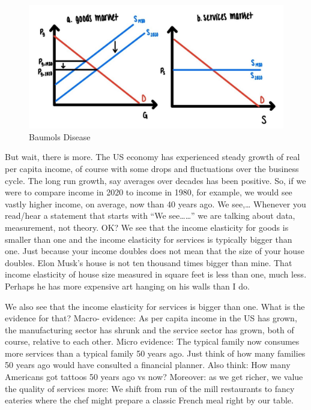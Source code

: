 \documentclass[
]{book}
\begin{document}
\begin{figure}

{\centering \includegraphics[width=1\linewidth]{img/ch5/fig12} 

}

\caption{Baumols Disease}\label{fig:fig512}
\end{figure}

But wait, there is more.
The US economy has experienced steady growth of real per capita income, of course with some drops and fluctuations over the business cycle. The long run growth, say averages over decades has been positive. So, if we were to compare income in 2020 to income in 1980, for example, we would see vastly higher income, on average, now than 40 years ago.
We see,\ldots{}
Whenever you read/hear a statement that starts with ``We see\ldots\ldots{}'' we are talking about data, measurement, not theory. OK?
We see that the income elasticity for goods is smaller than one and the income elasticity for services is typically bigger than one. Just because your income doubles does not mean that the size of your house doubles. Elon Musk's house is not ten thousand times bigger than mine. That income elasticity of house size measured in square feet is less than one, much less. Perhaps he has more expensive art hanging on his walls than I do.

We also see that the income elasticity for services is bigger than one. What is the evidence for that? Macro- evidence: As per capita income in the US has grown, the manufacturing sector has shrunk and the service sector has grown, both of course, relative to each other. Micro evidence: The typical family now consumes more services than a typical family 50 years ago. Just think of how many families 50 years ago would have consulted a financial planner. Also think: How many Americans got tattoos 50 years ago vs now? Moreover: as we get richer, we value the quality of services more: We shift from run of the mill restaurants to fancy eateries where the chef might prepare a classic French meal right by our table.
\end{document}
